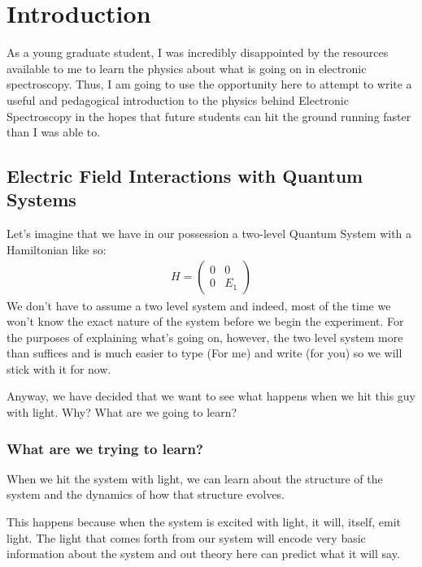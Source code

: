 \chapter{Introduction}
\newcommand{\doublemu}{ \vec{\mu} \boldsymbol{\mu}  }

As a young graduate student, I was incredibly disappointed by the resources available to me to learn the physics about what is going on in electronic spectroscopy.  Thus, I am going to use the opportunity here to attempt to write a useful and pedagogical introduction to the physics behind Electronic Spectroscopy in the hopes that future students can hit the ground running faster than I was able to.

\section{Electric Field Interactions with Quantum Systems}
Let's imagine that we have in our possession a two-level Quantum System with a Hamiltonian like so:
\begin{align}
	H = \left( \begin{array}{ccc}
		0 & 0 \\
		0 & E_1 \end{array} \right)
\end{align}
We don't have to assume a two level system and indeed, most of the time we won't know the exact nature of the system before we begin the experiment.  For the purposes of explaining what's going on, however, the two level system more than suffices and is much easier to type (For me) and write (for you) so we will stick with it for now.

Anyway, we have decided that we want to see what happens when we hit this guy with light.  Why?  What are we going to learn?

\subsection{What are we trying to learn?}
When we hit the system with light, we can learn about the structure of the system and the dynamics of how that structure evolves.

This happens because when the system is excited with light, it will, itself, emit light.  The light that comes forth from our system will encode very basic information about the system and out theory here can predict what it will say.

